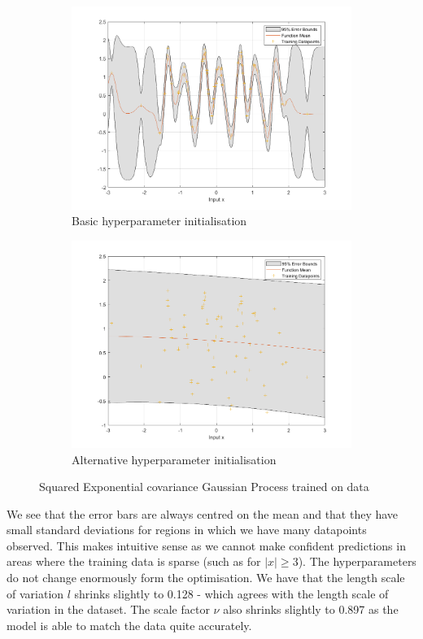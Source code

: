 \documentclass[]{article}
\begin{document}
\begin{figure}[!h]
	\begin{subfigure}{0.5\linewidth}
		\centering
		\includegraphics[width=\linewidth]{1a}
		\caption{Basic hyperparameter initialisation}
		\label{fig:1a}
	\end{subfigure}
	\begin{subfigure}{0.5\linewidth}
		\centering
		\includegraphics[width=\linewidth]{1b}
		\caption{Alternative hyperparameter initialisation}
		\label{fig:1b}
	\end{subfigure}
	\caption{Squared Exponential covariance Gaussian Process trained on data}
	\label{fig:1}
\end{figure}

We see that the error bars are always centred on the mean and that they have small standard deviations for regions in which we have many datapoints observed. This makes intuitive sense as we cannot make confident predictions in areas where the training data is sparse (such as for $|x| \geq 3$). The hyperparameters do not change enormously form the optimisation. We have that the length scale of variation $l$ shrinks slightly to 0.128 - which agrees with the length scale of variation in the dataset. The scale factor $\nu$ also shrinks slightly to 0.897 as the model is able to match the data quite accurately.
\end{document}
